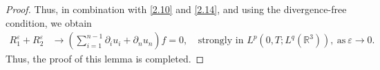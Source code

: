 \documentclass[10pt,a4paper]{amsart}
\newcommand{\ba}{\begin{aligned}}
\newcommand{\be}{\begin{equation}}
\newcommand{\ea}{\end{aligned}}
\newcommand{\ee}{\end{equation}}
\begin{document}
\begin{proof}
Thus, in combination with \eqref{2.10} and \eqref{2.14}, and using the divergence-free condition, we obtain
\be\label{2.15}\ba
R_1^\varepsilon+R_2^\varepsilon &\to (\sum_{i=1}^{n-1} \partial_i u_i+\partial_n u_n) f=0, ~&\text{strongly~in~} L^{p}(0,T;L^{q}(\mathbb{R}^3)), ~\text{as} ~\varepsilon \to 0.
\ea\ee
Thus, the proof of this lemma is completed.
\end{proof}
\end{document}
